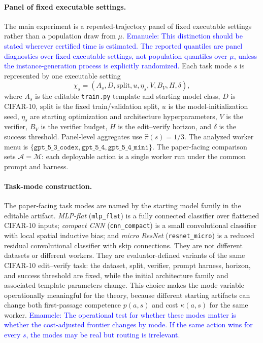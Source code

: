 \documentclass{article}
\newcommand{\cA}{\mathcal{A}}
\newcommand{\cM}{\mathcal{M}}
\begin{document}
\paragraph{Panel of fixed executable settings.}
The main experiment is a repeated-trajectory panel of fixed executable settings rather than a population draw from \(\mu\).
\textcolor{blue}{Emanuele: This distinction should be stated wherever certified time is estimated. The reported quantiles are panel diagnostics over fixed executable settings, not population quantiles over \(\mu\), unless the instance-generation process is explicitly randomized.}
Each task mode \(s\) is represented by one executable setting
\[
\chi_s=(A_s,D,\mathrm{split},u,\eta_s,V,B_V,H,\delta),
\]
where \(A_s\) is the editable \texttt{train.py} template and starting model class, \(D\) is CIFAR-10, \(\mathrm{split}\) is the fixed train/validation split, \(u\) is the model-initialization seed, \(\eta_s\) are starting optimization and architecture hyperparameters, \(V\) is the verifier, \(B_V\) is the verifier budget, \(H\) is the edit--verify horizon, and \(\delta\) is the success threshold.
Panel-level aggregates use \(\hat\pi(s)=1/3\).
The analyzed worker menu is \(\{\texttt{gpt\_5\_3\_codex},\texttt{gpt\_5\_4},\texttt{gpt\_5\_4\_mini}\}\).
The paper-facing comparison sets \(\cA=\cM\): each deployable action is a single worker run under the common prompt and harness.

\paragraph{Task-mode construction.}
The paper-facing task modes are named by the starting model family in the editable artifact.
\textit{MLP-flat} (\texttt{mlp\_flat}) is a fully connected classifier over flattened CIFAR-10 inputs; \textit{compact CNN} (\texttt{cnn\_compact}) is a small convolutional classifier with local spatial inductive bias; and \textit{micro ResNet} (\texttt{resnet\_micro}) is a reduced residual convolutional classifier with skip connections.
They are not different datasets or different workers.
They are evaluator-defined variants of the same CIFAR-10 edit--verify task: the dataset, split, verifier, prompt harness, horizon, and success threshold are fixed, while the initial architecture family and associated template parameters change.
This choice makes the mode variable operationally meaningful for the theory, because different starting artifacts can change both first-passage competence \(p(a,s)\) and cost \(\kappa(a,s)\) for the same worker.
\textcolor{blue}{Emanuele: The operational test for whether these modes matter is whether the cost-adjusted frontier changes by mode. If the same action wins for every \(s\), the modes may be real but routing is irrelevant.}
\end{document}

